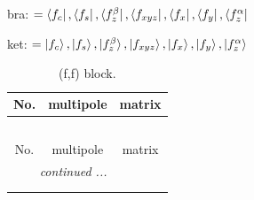 \documentclass[fleqn,8pt,landscape]{jsarticle}
\begin{document}
bra: $=\bra{f_{c}}, \bra{f_{s}}, \bra{f_{z}^{\beta}}, \bra{f_{xyz}}, \bra{f_{x}}, \bra{f_{y}}, \bra{f_{z}^{\alpha}}$

\noindent
ket: $=\ket{f_{c}}, \ket{f_{s}}, \ket{f_{z}^{\beta}}, \ket{f_{xyz}}, \ket{f_{x}}, \ket{f_{y}}, \ket{f_{z}^{\alpha}}$
\renewcommand{\arraystretch}{1.6}
\begin{longtable}{ccc}
\caption{(f,f) block.}
 \\
 \hline \hline
No. & multipole & matrix \\ \hline \endfirsthead

\multicolumn{2}{l}{\tablename\ \thetable{}} \\
 \hline \hline
No. & multipole & matrix \\ \hline \endhead

 \hline \hline
\multicolumn{2}{r}{\footnotesize\it continued ...} \\ \endfoot

 \hline \hline
\multicolumn{2}{r}{} \\ \endlastfoot


\end{longtable}
\end{document}

